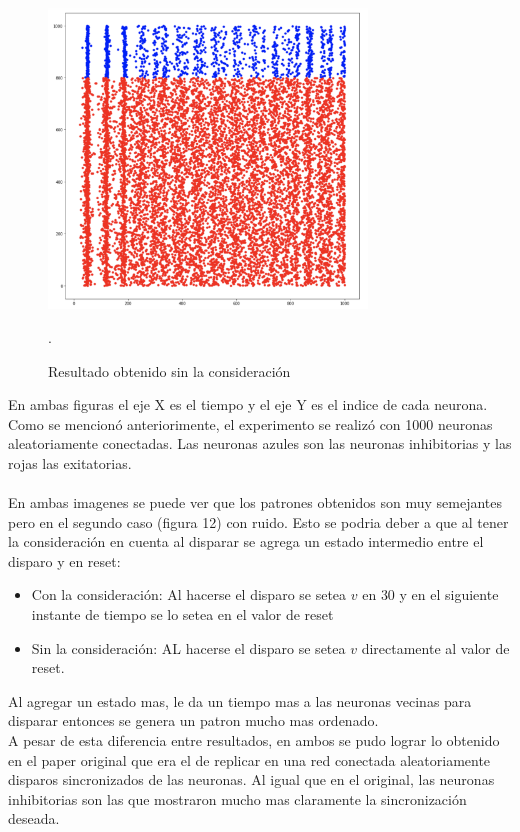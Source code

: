 \documentclass[12pt]{article}
\begin{document}
\begin{figure}[h!]
    \centering
        \includegraphics[height=8cm]{images/resultadoSinNorm.png}
    \caption[fontsize=2pt]{Resultado obtenido sin la consideración}.
\end{figure}

\newpage

En ambas figuras el eje X es el tiempo y el eje Y es el indice de cada neurona. Como se mencionó anteriorimente, el experimento se realizó con 1000 neuronas aleatoriamente conectadas.
Las neuronas azules son las neuronas inhibitorias y las rojas las exitatorias. \\ \\

En ambas imagenes se puede ver que los patrones obtenidos son muy semejantes pero en el segundo caso (figura 12) con ruido.
Esto se podria deber a que al tener la consideración en cuenta al disparar se agrega un estado intermedio entre el disparo y en reset:
\begin{itemize}
    \item Con la consideración: Al hacerse el disparo se setea $v$ en $30$ y en el siguiente instante de tiempo se lo setea en el valor de reset
    \item Sin la consideración: AL hacerse el disparo se setea $v$ directamente al valor de reset.
\end{itemize}

Al agregar un estado mas, le da un tiempo mas a las neuronas vecinas para disparar entonces se genera un patron mucho mas ordenado. \\

A pesar de esta diferencia entre resultados, en ambos se pudo lograr lo obtenido en el paper original que era el de replicar en una red conectada aleatoriamente disparos sincronizados de las neuronas.
Al igual que en el original, las neuronas inhibitorias son las que mostraron mucho mas claramente la sincronización deseada.
\end{document}
